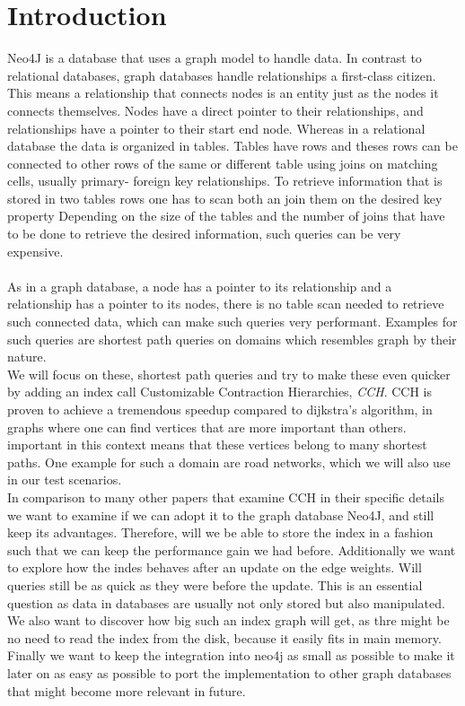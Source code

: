 \chapter{Introduction}

Neo4J is a database that uses a graph model to handle data. In contrast to relational databases, graph databases handle relationships a first-class citizen. 
This means a relationship that connects nodes is an entity just as the nodes it connects themselves. Nodes have a direct pointer to their relationships, and relationships
have a pointer to their start end node. Whereas in a relational database the data is organized in tables. Tables have rows and theses rows can be connected to other rows 
of the same or different table using joins on matching cells, usually primary- foreign key relationships. To retrieve information that is stored in two tables rows one has to scan 
both an join them on the desired key property Depending on the size of the tables and the number of joins that have to be done to retrieve the desired information, such queries
can be very expensive. 
\\\\
As in a graph database, a node has a pointer to its relationship and a relationship has a pointer to its nodes, there is no table scan needed to retrieve such connected data, which can make such queries very 
performant. Examples for such queries are shortest path queries on domains which resembles graph by their nature. 
\\
We will focus on these, shortest path queries and try to make these even quicker by adding an index call Customizable Contraction Hierarchies, \textit{CCH}. CCH is proven to achieve a tremendous speedup
compared to dijkstra's algorithm, in graphs where one can find vertices that are more important than others. important in this context means that these vertices belong to many shortest paths. One example for
such a domain are road networks, which we will also use in our test scenarios.  
\\
In comparison to many other papers that examine CCH in their specific details we want to examine if we can adopt it to the graph database Neo4J, and still keep its advantages. Therefore, will we be able to store the 
index in a fashion such that we can keep the performance gain we had before. Additionally we want to explore how the indes behaves after an update on the edge weights. Will queries still be as quick as they were before the update.
This is an essential question as data in databases are usually not only stored but also manipulated. We also want to discover how big such an index graph will get, as thre might be no need to read the index from the disk,
because it easily fits in main memory.
\\
Finally we want to keep the integration into neo4j as small as possible to make it later on as easy as possible to port the implementation to other graph databases that might become more relevant in future. 